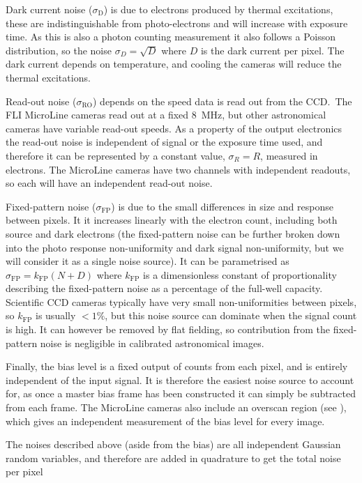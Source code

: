 \begin{colsection}
\begin{colsection}
Dark current noise ($\sigma_\text{D}$) is due to electrons produced by thermal excitations, these are indistinguishable from photo-electrons and will increase with exposure time. As this is also a photon counting measurement it also follows a Poisson distribution, so the noise $\sigma_D = \sqrt{D}$ where $D$ is the dark current per pixel. The dark current depends on temperature, and cooling the cameras will reduce the thermal excitations.

\newpage

Read-out noise ($\sigma_\text{RO}$) depends on the speed data is read out from the CCD.\ The FLI MicroLine cameras read out at a fixed \SI{8}{\mega\hertz}, but other astronomical cameras have variable read-out speeds. As a property of the output electronics the read-out noise is independent of signal or the exposure time used, and therefore it can be represented by a constant value, $\sigma_R = R$, measured in electrons. The MicroLine cameras have two channels with independent readouts, so each will have an independent read-out noise.

Fixed-pattern noise ($\sigma_\text{FP}$) is due to the small differences in size and response between pixels. It it increases linearly with the electron count, including both source and dark electrons (the fixed-pattern noise can be further broken down into the photo response non-uniformity and dark signal non-uniformity, but we will consider it as a single noise source). It can be parametrised as $\sigma_\text{FP} = k_\text{FP}(N+D)$ where $k_\text{FP}$ is a dimensionless constant of proportionality describing the fixed-pattern noise as a percentage of the full-well capacity. Scientific CCD cameras typically have very small non-uniformities between pixels, so $k_\text{FP}$ is usually $<1\%$, but this noise source can dominate when the signal count is high. It can however be removed by flat fielding, so contribution from the fixed-pattern noise is negligible in calibrated astronomical images.

Finally, the bias level is a fixed output of counts from each pixel, and is entirely independent of the input signal. It is therefore the easiest noise source to account for, as once a master bias frame has been constructed it can simply be subtracted from each frame. The MicroLine cameras also include an overscan region (see ), which gives an independent measurement of the bias level for every image.

The noises described above (aside from the bias) are all independent Gaussian random variables, and therefore are added in quadrature to get the total noise per pixel


\end{colsection}
\end{colsection}
